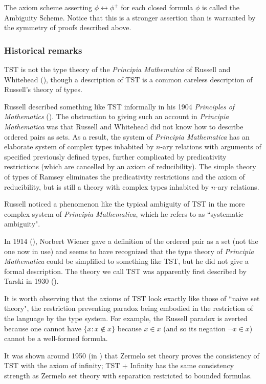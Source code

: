 \documentclass[112pt]{article}
\begin{document}
The axiom scheme asserting $\phi \leftrightarrow \phi^+$ for each closed formula $\phi$ is called the Ambiguity Scheme.   Notice that this is a stronger assertion than is warranted by the symmetry of proofs described above.

\subsubsection{Historical remarks}

TST is not the type theory of the {\em Principia Mathematica\/} of Russell and Whitehead (\cite{pm}), though a description of TST is a common careless description of Russell's theory of types.

Russell described something like TST informally in his 1904 {\em Principles of Mathematics\/} (\cite{pm1}).  The obstruction to giving such an account in {\em Principia Mathematica\/} was that
Russell and Whitehead did not know how to describe ordered pairs as sets.  As a result, the system of {\em Principia Mathematica\/} has an elaborate system of  complex
types inhabited by $n$-ary relations with arguments of specified previously defined types, further complicated by predicativity restrictions (which are cancelled by an axiom of reducibility).
The simple theory of types of Ramsey eliminates the predicativity restrictions and the axiom of reducibility, but is still a theory with complex types inhabited by $n$-ary relations.

Russell noticed a phenomenon like the typical ambiguity of TST in the more complex system of {\em Principia Mathematica\/}, which he refers to as ``systematic ambiguity".

In 1914 (\cite{wiener}), Norbert Wiener gave a definition of the ordered pair as a set (not the one now in use) and seems to have recognized that the type theory of {\em Principia Mathematica\/} could be simplified to something like TST, but he did not give a formal description.  The theory we call TST was apparently first described by Tarski in 1930 (\cite{tarskiontst}).

It is worth observing that the axioms of TST look exactly like those of ``naive set theory", the restriction preventing paradox being embodied in the restriction of the language by the type system.
For example, the Russell paradox is averted because one cannot have $\{x:x \not\in x\}$ because $x \in x$ (and so its negation $\neg x \in x$) cannot be a well-formed formula.

It was shown around 1950 (in \cite{kemeny}) that Zermelo set theory proves the consistency of TST with the axiom of infinity;  TST + Infinity has the same consistency strength as
Zermelo set theory with separation restricted to bounded formulas.
\end{document}
